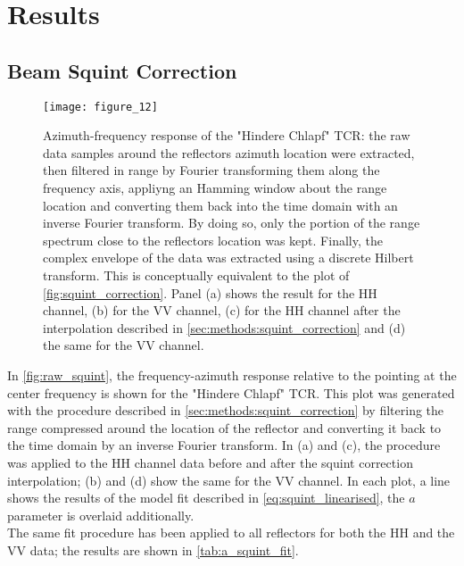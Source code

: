 \section{Results}\label{sec:results}
\subsection{Beam Squint Correction}\label{sec:results:squint_correction}
\begin{figure*}[Ht!]
	\centering
	\texttt{[image: figure\_12]}
	\caption{Azimuth-frequency response of the "Hindere Chlapf" TCR: the raw data samples around the reflectors azimuth location were extracted, then filtered in range by Fourier transforming them along the frequency axis, appliyng an Hamming window about the range location and converting them  back into the time domain with an inverse Fourier transform. By doing so, only the portion of the range spectrum close to the reflectors location was kept. Finally, the complex envelope of the data was extracted using a discrete Hilbert transform. This is conceptually equivalent to the plot of \autoref{fig:squint_correction}. Panel (a) shows the result for the HH channel, (b) for the VV channel, (c) for the HH channel after the interpolation described in \autoref{sec:methods:squint_correction}  and (d) the same for the VV channel.}
	\label{fig:raw_squint}
\end{figure*}
In \autoref{fig:raw_squint}, the frequency-azimuth response relative to the pointing at the center frequency is shown for the "Hindere Chlapf" TCR. This plot was generated with the procedure described in \autoref{sec:methods:squint_correction} by filtering the range compressed around the location of the reflector and converting it back to the time domain by an inverse Fourier transform. In (a) and (c), the procedure was applied to the HH channel data before and after the squint correction interpolation; (b) and (d) show the same for the VV channel. In each plot, a line shows the results of the model fit described in \autoref{eq:squint_linearised}, the $a$ parameter is overlaid additionally.\\
The same fit procedure has been applied to all reflectors for both the HH and the VV data; the results are shown in \autoref{tab:a_squint_fit}.\\
